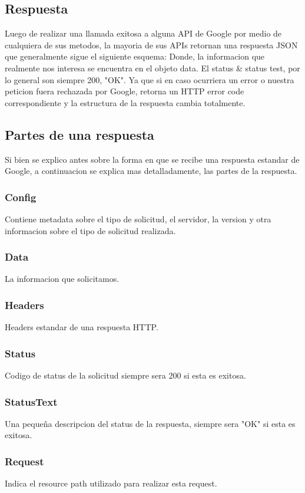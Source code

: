 \documentclass[titlepage]{article} %
\begin{document}
\subsection {Respuesta}
Luego de realizar una llamada exitosa a alguna API de Google por medio
de cualquiera de sus metodos, la mayoria de sus APIs retornan una respuesta JSON que generalmente sigue el siguiente esquema:
Donde, la informacion que realmente nos interesa se encuentra en 
el objeto data.
El status \& status test, por lo general son siempre 200, "OK". Ya que 
si en caso ocurriera un error o nuestra peticion fuera rechazada por Google, retorna un HTTP error code correspondiente y la estructura de la respuesta cambia totalmente.
\subsection{Partes de una respuesta}
Si bien se explico antes sobre la forma en que se recibe una respuesta 
estandar de Google, a continuacion se explica mas detalladamente, 
las partes de la respuesta.
\subsubsection{Config}
Contiene metadata sobre el tipo de solicitud, el servidor, la version y 
otra informacion sobre el tipo de solicitud realizada.
\subsubsection{Data}
La informacion que solicitamos.
\subsubsection{Headers}
Headers estandar de una respuesta HTTP.
\subsubsection{Status}
Codigo de status de la solicitud siempre sera 200 si esta es exitosa.
\subsubsection{StatusText}
Una pequeña descripcion del status de la respuesta, siempre sera "OK"
si esta es exitosa.
\subsubsection{Request} Indica el resource path utilizado para realizar
esta request.
\end{document}
